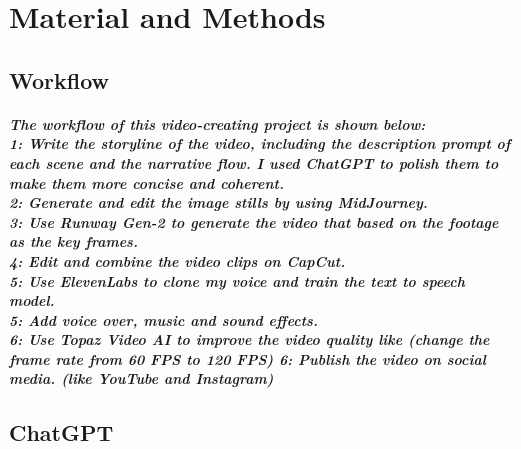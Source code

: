 \documentclass[11pt,a4paper,oneside]{report}
\begin{document}

\chapter{Material and Methods}
\label{material-and-methods}

\section{Workflow}
\paragraph{The workflow of this video-creating project is shown below: \\
1: Write the storyline of the video, including the description prompt of each scene and the narrative flow. I used ChatGPT to polish them to make them more concise and coherent.\\
2: Generate and edit the image stills by using MidJourney. \\
3: Use Runway Gen-2 to generate the video that based on the footage as the key frames.\\
4: Edit and combine the video clips on CapCut. \\
5: Use ElevenLabs to clone my voice and train the text to speech model.\\
5: Add voice over, music and sound effects. \\
6: Use Topaz Video AI to improve the video quality like (change the frame rate from 60 FPS to 120 FPS)
6: Publish the video on social media. (like YouTube and Instagram)\\}


\section{ChatGPT}
\end{document}
